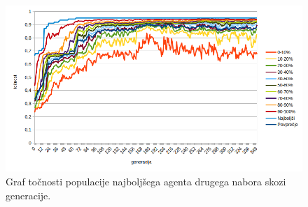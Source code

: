 %

\begin{figure}[H]
    \begin{center}
        \includegraphics[width=13cm]{wine/2/acc}
    \end{center}
    \caption{Graf točnosti populacije najboljšega agenta drugega nabora skozi generacije.}
    \label{fig:wine_acc_2}
\end{figure}

